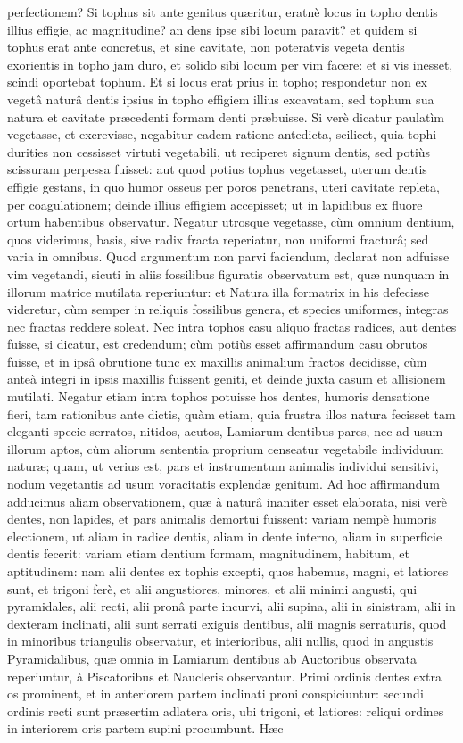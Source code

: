 \documentclass[a4paper, 11pt, oneside, polutonikogreek, german]{article}
\begin{document}
perfectionem? Si tophus sit ante genitus quæritur, eratnè locus in topho dentis illius effigie, ac magnitudine? an dens ipse sibi locum paravit? et quidem si tophus erat ante concretus, et sine cavitate, non poteratvis vegeta dentis exorientis in topho jam duro, et solido sibi locum per vim facere: et si vis inesset, scindi oportebat tophum. Et si locus erat prius in topho; respondetur non ex vegetâ naturâ dentis ipsius in topho effigiem illius excavatam, sed tophum sua natura et cavitate præcedenti formam denti præbuisse. Si verè dicatur paulatìm vegetasse, et excrevisse, negabitur eadem ratione antedicta, scilicet, quia tophi durities non cessisset virtuti vegetabili, ut reciperet signum dentis, sed potiùs scissuram perpessa fuisset: aut quod potius tophus vegetasset, uterum dentis effigie gestans, in quo humor osseus per poros penetrans, uteri cavitate repleta, per coagulationem; deinde illius effigiem accepisset; ut in lapidibus ex fluore ortum habentibus observatur. Negatur utrosque vegetasse, cùm omnium dentium, quos viderimus, basis, sive radix fracta reperiatur, non uniformi fracturâ; sed varia in omnibus. Quod argumentum non parvi faciendum, declarat non adfuisse vim vegetandi, sicuti in aliis fossilibus figuratis observatum est, quæ nunquam in illorum matrice mutilata reperiuntur: et Natura illa formatrix in his defecisse videretur, cùm semper in reliquis fossilibus genera, et species uniformes, integras nec fractas reddere soleat. Nec intra tophos casu aliquo fractas radices, aut dentes fuisse, si dicatur, est credendum; cùm potiùs esset affirmandum casu obrutos fuisse, et in ipsâ obrutione tunc ex maxillis animalium fractos decidisse, cùm anteà integri in ipsis maxillis fuissent geniti, et deinde juxta casum et allisionem mutilati. Negatur etiam intra tophos potuisse hos dentes, humoris densatione fieri, tam rationibus ante dictis, quàm etiam, quia frustra illos natura fecisset tam eleganti specie serratos, nitidos, acutos, Lamiarum dentibus pares, nec ad usum illorum aptos, cùm aliorum sententia proprium censeatur vegetabile individuum naturæ; quam, ut verius est, pars et instrumentum animalis individui sensitivi, nodum vegetantis ad usum voracitatis explendæ genitum. Ad hoc affirmandum adducimus aliam observationem, quæ à naturâ inaniter esset elaborata, nisi verè dentes, non lapides, et pars animalis demortui fuissent: variam nempè humoris electionem, ut aliam in radice dentis, aliam in dente interno, aliam in superficie dentis fecerit: variam etiam dentium formam, magnitudinem, habitum, et aptitudinem: nam alii dentes ex tophis excepti, quos habemus, magni, et latiores sunt, et trigoni ferè, et alii angustiores, minores, et alii minimi angusti, qui pyramidales, alii recti, alii pronâ parte incurvi, alii supina, alii in sinistram, alii in dexteram inclinati, alii sunt serrati exiguis dentibus, alii magnis serraturis, quod in minoribus triangulis observatur, et interioribus, alii nullis, quod in angustis Pyramidalibus, quæ omnia in Lamiarum dentibus ab Auctoribus observata reperiuntur, à Piscatoribus et Naucleris observantur. Primi ordinis dentes extra os prominent, et in anteriorem partem inclinati proni conspiciuntur: secundi ordinis recti sunt præsertim adlatera oris, ubi trigoni, et latiores: reliqui ordines in interiorem oris partem supini procumbunt. Hæc 
\end{document}
